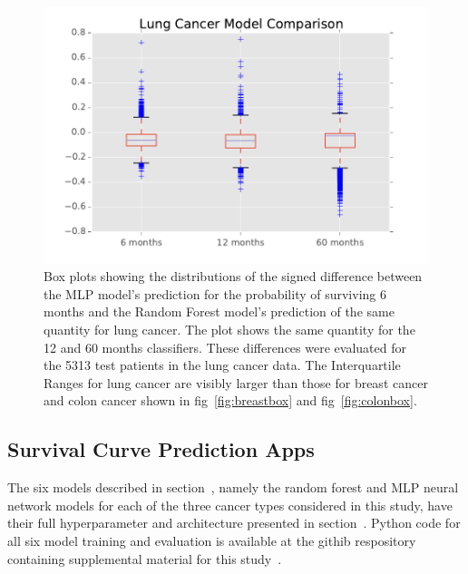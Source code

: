 \documentclass[10pt,letterpaper]{article}
\begin{document}
\begin{figure}[tbp]
\centering 
\begin{center}
\includegraphics[width=.90\textwidth,origin=c]{lungbox.pdf}
\caption{\label{fig:lungbox} Box plots showing the distributions of the signed difference between the MLP model's prediction for the probability of surviving 6 months and the Random Forest model's prediction of the same quantity for lung cancer. The plot shows the same quantity for the 12 and 60 months classifiers. These differences were evaluated for the 5313 test patients in the lung cancer data. The Interquartile Ranges for lung cancer are visibly larger than those for breast cancer and colon cancer shown in fig~\ref{fig:breastbox} and fig~\ref{fig:colonbox}.}
\end{center}
\end{figure}



\subsection*{Survival Curve Prediction Apps}
\label{sec:apps}


The six models described in section~, namely the random forest and MLP neural network models for each of the three cancer types considered in this study, have their full hyperparameter and architecture presented in section~. Python code for all six model training and evaluation is available at the githib respository containing supplemental material for this study~\cite{supp}.
\end{document}
